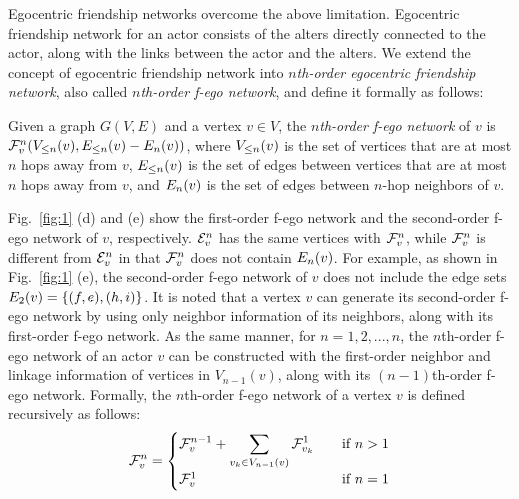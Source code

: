 Egocentric friendship networks overcome the above limitation. 
Egocentric friendship network for an actor consists of the alters directly connected to the actor, along with the links between the actor and the alters. 
We extend the concept of egocentric friendship network into \emph{$n$th-order egocentric friendship network}, also called \emph{$n$th-order f-ego network}, and define it formally as follows:  
\begin{definition}\label{def:multi-order-friendship-network}
Given a graph $G(V, E)$ and a vertex $v \in V$, the \emph{$n$th-order f-ego network} of $v$ is $\FNN{v}{n}(\LV{v}{n}, \LE{v}{n} - \E{v}{n})$, where $\LV{v}{n}$ is the set of vertices that are at most $n$ hops away from $v$, $\LE{v}{n}$ is the set of edges between vertices that are at most $n$ hops away from $v$, and $\E{v}{n}$ is the set of edges between $n$-hop neighbors of $v$.
\end{definition}
Fig.~\ref{fig:1} (d) and (e) show the first-order f-ego network and the second-order f-ego network of $v$, respectively. 
$\ENN{v}{n}$ has the same vertices with $\FNN{v}{n}$, while $\FNN{v}{n}$ is different from $\ENN{v}{n}$ in that $\FNN{v}{n}$ does not contain $\E{v}{n}$. 
For example, as shown in Fig.~\ref{fig:1} (e), the second-order f-ego network of $v$ does not include the edge sets $\E{v}{2}=\{ (f, e), (h, i) \}$. It is noted that a vertex $v$ can generate its second-order f-ego network by using only neighbor information of its neighbors, along with its first-order f-ego network. 
As the same manner, for $n=1, 2, ..., n$, the $n$th-order f-ego network of an actor $v$ can be constructed with the first-order neighbor and linkage information of vertices in $V_{n-1} (v)$, along with its $(n-1)$th-order f-ego network. Formally, the $n$th-order f-ego network of a vertex $v$ is defined recursively as follows:
\begin{eqnarray}
\displaystyle
\FNN{v}{n} = 
\begin{cases}
    \displaystyle
 	\FNN{v}{n-1} + \sum_{ v_k \in V_{n-1} (v)} \FNN{v_k}{1}       & \quad \text{if } n > 1\\
    \FNN{v}{1}  & \quad \text{if } n = 1
\end{cases}
\end{eqnarray}

